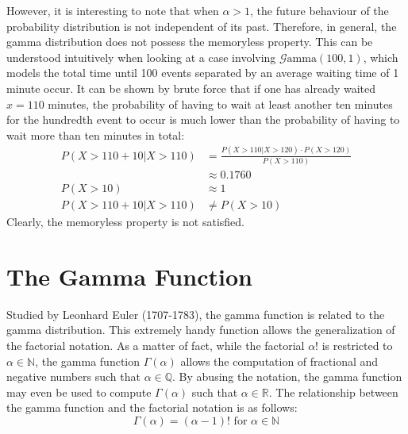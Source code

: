 \documentclass[12pt]{article}
\newcommand{\G}{\mathcal{G}}
\begin{document}
However, it is interesting to note that when $\alpha>1$, the future behaviour of the probability distribution is not
independent of its past. Therefore, in general, the gamma distribution does not possess the memoryless property. This
can be understood intuitively when looking at a case involving $\G\text{amma}(100, 1)$, which models the total time
until 100 events separated by an average waiting time of 1 minute occur. It can be shown by brute force that if one has
already waited $x=110$ minutes, the probability of having to wait at least another ten minutes for the hundredth event
to occur is much lower than the probability of having to wait more than ten minutes in total\cite{myersCS547Lecture,
probabilitycourseExponentialDistribution}:
\begin{equation}
	\begin{split}
		P(X>110+10 | X>110)	&=			\frac{P(X>110 | X>120)\cdot P(X>120)}{P(X>110)}\\
							&\approx	0.1760\\
		P(X>10)				&\approx	1\\
		P(X>110+10 | X>110)	&\neq		P(X>10)
	\end{split}
\end{equation}
Clearly, the memoryless property is not satisfied.


\pagebreak
\section{The Gamma Function}
\vspace*{-6pt}
Studied by Leonhard Euler (1707-1783), the gamma function is related to the gamma distribution. This extremely handy
function allows the generalization of the factorial notation. As a matter of fact, while the factorial $\alpha!$ is
restricted to $\alpha\in\mathbb{N}$, the gamma function $\Gamma(\alpha)$ allows the computation of fractional and
negative numbers such that $\alpha\in\mathbb{Q}$. By abusing the notation, the gamma function may even be used to
compute $\Gamma(\alpha)$ such that $\alpha\in\mathbb{R}$. The relationship between the gamma function and the factorial
notation is as follows:
\vspace*{-18pt}
\begin{equation}\label{eq:gammafunction:factorial}
	\Gamma(\alpha)=(\alpha-1)!\text{ for }\alpha\in\mathbb{N}
\end{equation}
\vspace*{-60pt}
\end{document}
